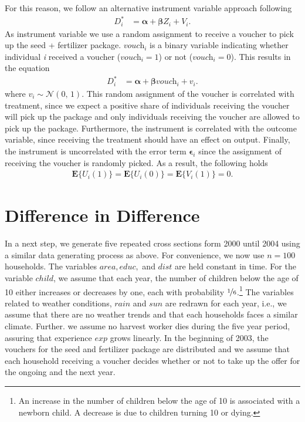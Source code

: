 For this reason, we follow an alternative instrument variable approach following 
\begin{align}
	\label{eq:eq8}
	\textit{D}_i^\ast &= \boldsymbol{\alpha} + \boldsymbol{\beta} \textit{Z}_i + \textit{V}_i.
\end{align}
As instrument variable we use a random assignment to receive a voucher to pick up the seed + fertilizer package. $\textit{vouch}_i$ is a binary variable indicating whether individual \textit{i} received a voucher ($\textit{vouch}_i = 1$) or not ($\textit{vouch}_i = 0$). This results in the equation
\begin{align}
	\label{eq:eq9}
	\textit{D}_i^\ast &= \boldsymbol{\alpha} + \boldsymbol{\beta} \textit{vouch}_i + \textit{v}_i.
\end{align}
where $\textit{v}_i \sim \mathcal{N}(0,\,1)$. This random assignment of the voucher is correlated with treatment, since we expect a positive share of individuals receiving the voucher will pick up the package and only individuals receiving the voucher are allowed to pick up the package. Furthermore, the instrument is correlated with the outcome variable, since receiving the treatment should have an effect on output. Finally, the instrument is uncorrelated with the error term $\boldsymbol{\epsilon}_i$ since the assignment of receiving the voucher is randomly picked. As a result, the following holds
\begin{align}
	\label{eq:eq10}
	\boldsymbol{E}\{\textit{U}_i(1)\} = \boldsymbol{E}\{\textit{U}_i(0)\} = \boldsymbol{E}\{\textit{V}_i(1)\} = 0.
\end{align}


\section{Difference in Difference} \label{sec:difference}



In a next step, we generate five repeated cross sections form 2000 until 2004 using a similar data generating process as above. For convenience, we now use $n=100$ households. The variables $area, educ,$ and $dist$ are held constant in time. For the variable $child$, we assume that each year, the number of children below the age of 10 either increases or decreases by one, each with probability $\nicefrac{1}{6}$.\footnote{An increase in the number of children below the age of 10 is associated with a newborn child. A decrease is due to children turning 10 or dying.} The variables related to weather conditions, $rain$ and $sun$ are redrawn for each year, i.e., we assume that there are no weather trends and that each households faces a similar climate. Further. we assume no harvest worker dies during the five year period, assuring that experience $exp$ grows linearly. In the beginning of 2003, the vouchers for the seed and fertilizer package are distributed and we assume that each household receiving a voucher decides whether or not to take up the offer for the ongoing and the next year.


